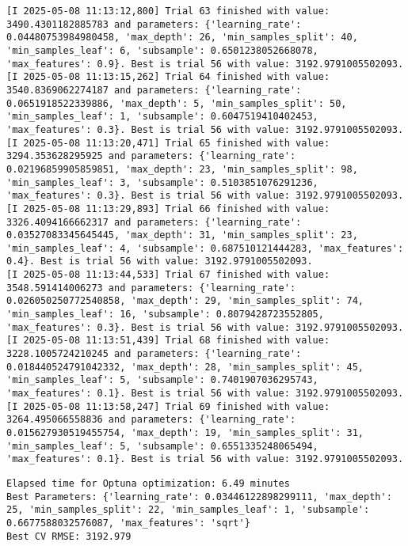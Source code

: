\documentclass[
  letterpaper,
  DIV=11,
  numbers=noendperiod]{scrreprt}
\begin{document}
\begin{verbatim}
[I 2025-05-08 11:13:12,800] Trial 63 finished with value: 3490.4301182885783 and parameters: {'learning_rate': 0.04480753984980458, 'max_depth': 26, 'min_samples_split': 40, 'min_samples_leaf': 6, 'subsample': 0.6501238052668078, 'max_features': 0.9}. Best is trial 56 with value: 3192.9791005502093.
[I 2025-05-08 11:13:15,262] Trial 64 finished with value: 3540.8369062274187 and parameters: {'learning_rate': 0.0651918522339886, 'max_depth': 5, 'min_samples_split': 50, 'min_samples_leaf': 1, 'subsample': 0.6047519410402453, 'max_features': 0.3}. Best is trial 56 with value: 3192.9791005502093.
[I 2025-05-08 11:13:20,471] Trial 65 finished with value: 3294.353628295925 and parameters: {'learning_rate': 0.02196859905859851, 'max_depth': 23, 'min_samples_split': 98, 'min_samples_leaf': 3, 'subsample': 0.5103851076291236, 'max_features': 0.3}. Best is trial 56 with value: 3192.9791005502093.
[I 2025-05-08 11:13:29,893] Trial 66 finished with value: 3326.4094166662317 and parameters: {'learning_rate': 0.03527083345645445, 'max_depth': 31, 'min_samples_split': 23, 'min_samples_leaf': 4, 'subsample': 0.687510121444283, 'max_features': 0.4}. Best is trial 56 with value: 3192.9791005502093.
[I 2025-05-08 11:13:44,533] Trial 67 finished with value: 3548.591414006273 and parameters: {'learning_rate': 0.026050250772540858, 'max_depth': 29, 'min_samples_split': 74, 'min_samples_leaf': 16, 'subsample': 0.8079428723552805, 'max_features': 0.3}. Best is trial 56 with value: 3192.9791005502093.
[I 2025-05-08 11:13:51,439] Trial 68 finished with value: 3228.1005724210245 and parameters: {'learning_rate': 0.018440524791042332, 'max_depth': 28, 'min_samples_split': 45, 'min_samples_leaf': 5, 'subsample': 0.7401907036295743, 'max_features': 0.1}. Best is trial 56 with value: 3192.9791005502093.
[I 2025-05-08 11:13:58,247] Trial 69 finished with value: 3264.495066558836 and parameters: {'learning_rate': 0.015627930519455754, 'max_depth': 19, 'min_samples_split': 31, 'min_samples_leaf': 5, 'subsample': 0.6551335248065494, 'max_features': 0.1}. Best is trial 56 with value: 3192.9791005502093.
\end{verbatim}

\begin{verbatim}
Elapsed time for Optuna optimization: 6.49 minutes
Best Parameters: {'learning_rate': 0.03446122898299111, 'max_depth': 25, 'min_samples_split': 22, 'min_samples_leaf': 1, 'subsample': 0.6677588032576087, 'max_features': 'sqrt'}
Best CV RMSE: 3192.979
\end{verbatim}
\end{document}
